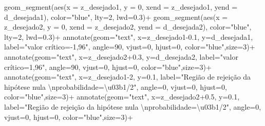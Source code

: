 \documentclass[
]{book}
\newenvironment{Shaded}{\begin{snugshade}}{\end{snugshade}}
\newcommand{\AttributeTok}[1]{\textcolor[rgb]{0.77,0.63,0.00}{#1}}
\newcommand{\DecValTok}[1]{\textcolor[rgb]{0.00,0.00,0.81}{#1}}
\newcommand{\FloatTok}[1]{\textcolor[rgb]{0.00,0.00,0.81}{#1}}
\newcommand{\FunctionTok}[1]{\textcolor[rgb]{0.00,0.00,0.00}{#1}}
\newcommand{\NormalTok}[1]{#1}
\newcommand{\SpecialCharTok}[1]{\textcolor[rgb]{0.00,0.00,0.00}{#1}}
\newcommand{\StringTok}[1]{\textcolor[rgb]{0.31,0.60,0.02}{#1}}
\begin{document}
\begin{Shaded}
\begin{Highlighting}[]
  \FunctionTok{geom\_segment}\NormalTok{(}\FunctionTok{aes}\NormalTok{(}\AttributeTok{x =}\NormalTok{ z\_desejado1, }\AttributeTok{y =} \DecValTok{0}\NormalTok{, }\AttributeTok{xend =}\NormalTok{ z\_desejado1, }\AttributeTok{yend =}\NormalTok{ d\_desejada1), }\AttributeTok{color=}\StringTok{"blue"}\NormalTok{, }\AttributeTok{lty=}\DecValTok{2}\NormalTok{, }\AttributeTok{lwd=}\FloatTok{0.3}\NormalTok{)}\SpecialCharTok{+}
  \FunctionTok{geom\_segment}\NormalTok{(}\FunctionTok{aes}\NormalTok{(}\AttributeTok{x =}\NormalTok{ z\_desejado2, }\AttributeTok{y =} \DecValTok{0}\NormalTok{, }\AttributeTok{xend =}\NormalTok{ z\_desejado2, }\AttributeTok{yend =}\NormalTok{ d\_desejada2), }\AttributeTok{color=}\StringTok{"blue"}\NormalTok{, }\AttributeTok{lty=}\DecValTok{2}\NormalTok{, }\AttributeTok{lwd=}\FloatTok{0.3}\NormalTok{)}\SpecialCharTok{+}
  \FunctionTok{annotate}\NormalTok{(}\AttributeTok{geom=}\StringTok{"text"}\NormalTok{, }\AttributeTok{x=}\NormalTok{z\_desejado1}\FloatTok{{-}0.1}\NormalTok{, }\AttributeTok{y=}\NormalTok{d\_desejada1, }\AttributeTok{label=}\StringTok{"valor crítico={-}1,96"}\NormalTok{, }\AttributeTok{angle=}\DecValTok{90}\NormalTok{, }\AttributeTok{vjust=}\DecValTok{0}\NormalTok{, }\AttributeTok{hjust=}\DecValTok{0}\NormalTok{, }\AttributeTok{color=}\StringTok{"blue"}\NormalTok{,}\AttributeTok{size=}\DecValTok{3}\NormalTok{)}\SpecialCharTok{+}
  \FunctionTok{annotate}\NormalTok{(}\AttributeTok{geom=}\StringTok{"text"}\NormalTok{, }\AttributeTok{x=}\NormalTok{z\_desejado2}\FloatTok{+0.3}\NormalTok{, }\AttributeTok{y=}\NormalTok{d\_desejada2, }\AttributeTok{label=}\StringTok{"valor crítico=1,96"}\NormalTok{, }\AttributeTok{angle=}\DecValTok{90}\NormalTok{, }\AttributeTok{vjust=}\DecValTok{0}\NormalTok{, }\AttributeTok{hjust=}\DecValTok{0}\NormalTok{, }\AttributeTok{color=}\StringTok{"blue"}\NormalTok{,}\AttributeTok{size=}\DecValTok{3}\NormalTok{)}\SpecialCharTok{+}
  \FunctionTok{annotate}\NormalTok{(}\AttributeTok{geom=}\StringTok{"text"}\NormalTok{, }\AttributeTok{x=}\NormalTok{z\_desejado1}\DecValTok{{-}2}\NormalTok{, }\AttributeTok{y=}\FloatTok{0.1}\NormalTok{, }\AttributeTok{label=}\StringTok{"Região de rejeição da hipótese nula }\SpecialCharTok{\textbackslash{}n}\StringTok{probabilidade=\textbackslash{}u03b1/2"}\NormalTok{, }\AttributeTok{angle=}\DecValTok{0}\NormalTok{, }\AttributeTok{vjust=}\DecValTok{0}\NormalTok{, }\AttributeTok{hjust=}\DecValTok{0}\NormalTok{, }\AttributeTok{color=}\StringTok{"blue"}\NormalTok{,}\AttributeTok{size=}\DecValTok{3}\NormalTok{)}\SpecialCharTok{+}
  \FunctionTok{annotate}\NormalTok{(}\AttributeTok{geom=}\StringTok{"text"}\NormalTok{, }\AttributeTok{x=}\NormalTok{z\_desejado2}\FloatTok{+0.5}\NormalTok{, }\AttributeTok{y=}\FloatTok{0.1}\NormalTok{, }\AttributeTok{label=}\StringTok{"Região de rejeição da hipótese nula }\SpecialCharTok{\textbackslash{}n}\StringTok{probabilidade=\textbackslash{}u03b1/2"}\NormalTok{, }\AttributeTok{angle=}\DecValTok{0}\NormalTok{, }\AttributeTok{vjust=}\DecValTok{0}\NormalTok{, }\AttributeTok{hjust=}\DecValTok{0}\NormalTok{, }\AttributeTok{color=}\StringTok{"blue"}\NormalTok{,}\AttributeTok{size=}\DecValTok{3}\NormalTok{)}\SpecialCharTok{+}

\end{Highlighting}
\end{Shaded}
\end{document}
